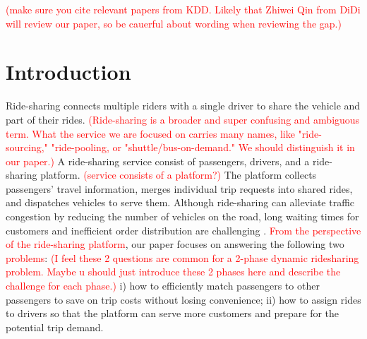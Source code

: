 \documentclass[sigconf]{acmart}
\newcommand{\tcr}[1]{{\textcolor{red}{#1}}}
\begin{document}



\maketitle

\tcr{(make sure you cite relevant papers from KDD. Likely that Zhiwei Qin from DiDi will review our paper, so be cauerful about wording when reviewing the gap.)}

\section{Introduction}

Ride-sharing connects multiple riders with a single driver to share the vehicle
and part of their rides. \tcr{(Ride-sharing is a broader and super confusing and ambiguous term. What the service we are focused on carries many names, like "ride-sourcing," "ride-pooling, or "shuttle/bus-on-demand." We should distinguish it in our paper.)}
A ride-sharing service consist of
passengers, drivers, and a ride-sharing platform. \tcr{(service consists of a platform?)} 
The platform collects
passengers' travel information, merges individual trip requests into
shared rides, and dispatches vehicles to serve them. 
Although ride-sharing can alleviate traffic congestion by reducing the number of vehicles on the road, long waiting times for customers and inefficient order distribution are challenging . 
\tcr{From the perspective of the ride-sharing platform}, 
our paper focuses on answering the following two
\tcr{problems}: 
\tcr{(I feel these 2 questions are common for a 2-phase dynamic ridesharing problem. Maybe u should just introduce these 2 phases here and describe the challenge for each phase.)}
i) how to efficiently match passengers to other passengers
to save on trip costs without losing convenience; 
ii) how to assign rides to drivers so that the platform can serve more customers and prepare for the potential trip demand.
\end{document}
